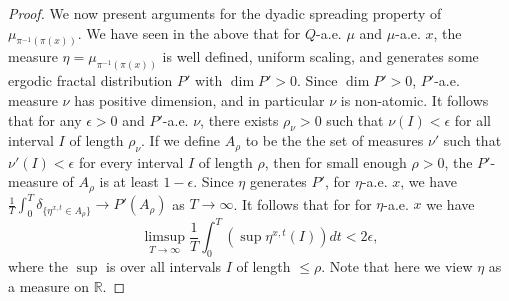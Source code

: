 \documentclass[a4paper,11pt]{amsart}
\theoremstyle{definition}
\numberwithin{equation}{section}
\def\to{\rightarrow}
\def\R{\mathbb R}
\begin{document}
\begin{proof}
We now present arguments for the dyadic spreading property of  $\mu_{\pi^{-1}(\pi(x))}$.  We have seen in the above that for $Q$-a.e.  $\mu$ and $\mu$-a.e.  $x$, the measure $\eta=\mu_{\pi^{-1}(\pi(x))}$ is well defined,  uniform scaling,  and  generates some ergodic fractal distribution $P'$ with $\dim P'>0$.  
Since $\dim P'>0$,  $P'$-a.e.  measure $\nu$ has positive dimension,  and in particular $\nu$ is non-atomic.  It follows that for any $\epsilon>0$ and $P'$-a.e.  $\nu$, there exists $\rho_\nu>0$ such that $\nu(I)<\epsilon$ for all interval $I$ of length $\rho_\nu$.  If we define $A_\rho$ to be the the set of measures $\nu'$ such that $\nu'(I)<\epsilon$ for every interval $I$ of length $\rho$, then for small enough $\rho>0$, the $P'$-measure of $A_\rho$ is at least $1-\epsilon$.  Since $\eta$ generates $P'$, for $\eta$-a.e.  $x$, we have $\frac{1}{T}\int_0^T\delta_{\{\eta^{x,t}\in A_\rho\}}\to P'(A_\rho)$ as $T\to \infty$.  It follows that for for $\eta$-a.e.  $x$ we have
\begin{equation}\label{eq:pf:prop:slice-cp-distribution:1}
\limsup_{T\to\infty} \frac{1}{T}\int_0^T \left( \sup \eta^{x,t}(I)  \right) dt <2\epsilon,
\end{equation}
where the $\sup$ is over all intervals $I$ of length $\le \rho.$
Note that here we view $\eta$ as a measure on $\R$.  


\end{proof}
\end{document}
